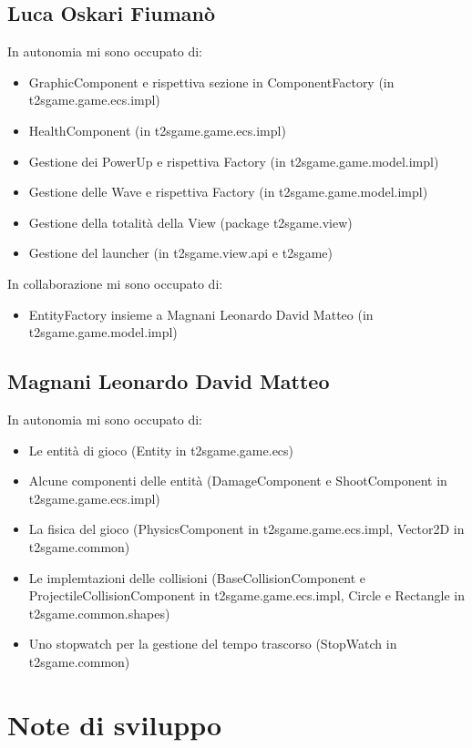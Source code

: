 \documentclass[a4paper,12pt]{report}
\begin{document}
\subsection*{Luca Oskari Fiumanò}
In autonomia mi sono occupato di:
\begin{itemize}
	\item GraphicComponent e rispettiva sezione in ComponentFactory (in t2sgame.game.ecs.impl)
	\item HealthComponent (in t2sgame.game.ecs.impl)
	\item Gestione dei PowerUp e rispettiva Factory (in t2sgame.game.model.impl)
	\item Gestione delle Wave e rispettiva Factory (in t2sgame.game.model.impl)
	\item Gestione della totalità della View (package t2sgame.view)
    \item Gestione del launcher (in t2sgame.view.api e t2sgame)
\end{itemize}
In collaborazione mi sono occupato di:
\begin{itemize}
	\item EntityFactory insieme a Magnani Leonardo David Matteo (in t2sgame.game.model.impl)
\end{itemize}


\subsection*{Magnani Leonardo David Matteo}
In autonomia mi sono occupato di:
\begin{itemize}
\item Le entità di gioco (Entity in t2sgame.game.ecs)
\item Alcune componenti delle entità (DamageComponent e ShootComponent in t2sgame.game.ecs.impl)
\item La fisica del gioco (PhysicsComponent in t2sgame.game.ecs.impl, Vector2D in  t2sgame.common)
\item Le implemtazioni delle collisioni (BaseCollisionComponent e ProjectileCollisionComponent in t2sgame.game.ecs.impl, Circle e Rectangle in t2sgame.common.shapes)
\item Uno stopwatch per la gestione del tempo trascorso (StopWatch in t2sgame.common)
\end{itemize}

\section{Note di sviluppo}
\end{document}
